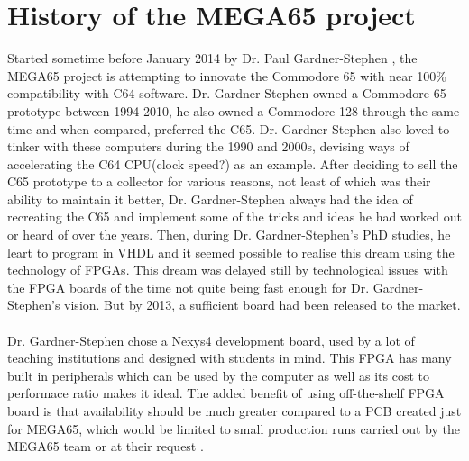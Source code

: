 \section{History of the MEGA65 project}
Started sometime before January 2014 by Dr. Paul Gardner-Stephen \cite{blogjan14}, the MEGA65 project is attempting to innovate the Commodore 65 with near 100\% compatibility with C64 software. Dr. Gardner-Stephen  owned a Commodore 65 prototype between 1994-2010, he also owned a Commodore 128 through the same time and when compared, preferred the C65. Dr. Gardner-Stephen also loved to tinker with these computers during the 1990 and 2000s, devising ways of accelerating the C64 CPU(clock speed?) as an example. After deciding to sell the C65 prototype to a collector for various reasons, not least of which was their ability to maintain it better, Dr. Gardner-Stephen always had the idea of recreating the C65 and implement some of the tricks and ideas he had worked out or heard of over the years. Then, during Dr. Gardner-Stephen's PhD studies, he leart to program in VHDL and it seemed possible to realise this dream using the technology of FPGAs. This dream was delayed still by technological issues with the FPGA boards of the time not quite being fast enough for Dr. Gardner-Stephen's vision. But by 2013, a sufficient board had been released to the market. \\\\

Dr. Gardner-Stephen chose a Nexys4 development board, used by a lot of teaching institutions and designed with students in mind. This FPGA has many built in peripherals which can be used by the computer as well as its cost to performace ratio makes it ideal. The added benefit of using off-the-shelf FPGA board is that availability should be much greater compared to a PCB created just for MEGA65, which would be limited to small production runs carried out by the MEGA65 team or at their request \cite{blog30jan14}. \\\\

